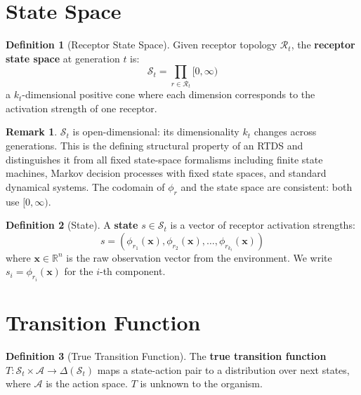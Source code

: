 \documentclass[12pt]{article}
\theoremstyle{definition}
\newtheorem{definition}{Definition}
\newtheorem{remark}{Remark}
\begin{document}
\section{State Space}

\begin{definition}[Receptor State Space]
Given receptor topology $\mathcal{R}_t$, the \textbf{receptor state space} at generation
$t$ is:
\[
\mathcal{S}_t = \prod_{r \in \mathcal{R}_t} [0, \infty)
\]
a $k_t$-dimensional positive cone where each dimension corresponds to the activation
strength of one receptor.
\end{definition}

\begin{remark}
$\mathcal{S}_t$ is open-dimensional: its dimensionality $k_t$ changes across generations.
This is the defining structural property of an RTDS and distinguishes it from all fixed
state-space formalisms including finite state machines, Markov decision processes with
fixed state spaces, and standard dynamical systems. The codomain of $\phi_r$ and the
state space are consistent: both use $[0, \infty)$.
\end{remark}

\begin{definition}[State]
A \textbf{state} $s \in \mathcal{S}_t$ is a vector of receptor activation strengths:
\[
s = (\phi_{r_1}(\mathbf{x}), \phi_{r_2}(\mathbf{x}), \ldots, \phi_{r_{k_t}}(\mathbf{x}))
\]
where $\mathbf{x} \in \mathbb{R}^n$ is the raw observation vector from the environment.
We write $s_i = \phi_{r_i}(\mathbf{x})$ for the $i$-th component.
\end{definition}

\section{Transition Function}

\begin{definition}[True Transition Function]
The \textbf{true transition function} $T : \mathcal{S}_t \times \mathcal{A} \to \Delta(\mathcal{S}_t)$
maps a state-action pair to a distribution over next states, where $\mathcal{A}$ is the
action space. $T$ is unknown to the organism.
\end{definition}
\end{document}
